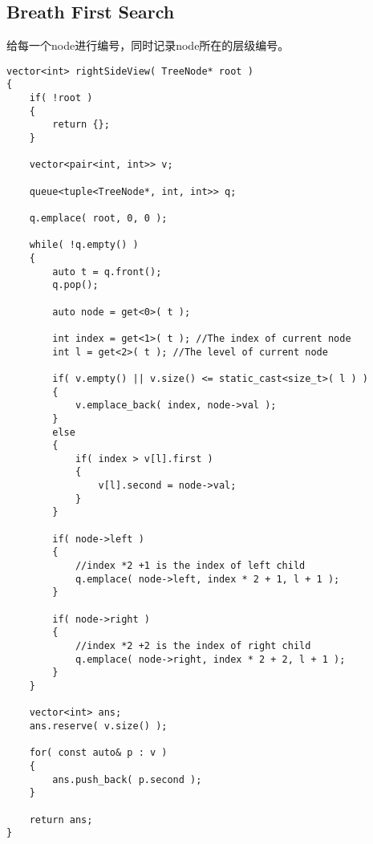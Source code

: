 \subsection{Breath First Search}
\begin{CJK*}{UTF8}{gbsn}
给每一个node进行编号，同时记录node所在的层级编号。
\end{CJK*}
\begin{lstlisting}[style=customc]
vector<int> rightSideView( TreeNode* root )
{
    if( !root )
    {
        return {};
    }

    vector<pair<int, int>> v;

    queue<tuple<TreeNode*, int, int>> q;

    q.emplace( root, 0, 0 );

    while( !q.empty() )
    {
        auto t = q.front();
        q.pop();

        auto node = get<0>( t );

        int index = get<1>( t ); //The index of current node
        int l = get<2>( t ); //The level of current node

        if( v.empty() || v.size() <= static_cast<size_t>( l ) )
        {
            v.emplace_back( index, node->val );
        }
        else
        {
            if( index > v[l].first )
            {
                v[l].second = node->val;
            }
        }

        if( node->left )
        {
            //index *2 +1 is the index of left child
            q.emplace( node->left, index * 2 + 1, l + 1 );
        }

        if( node->right )
        {
            //index *2 +2 is the index of right child
            q.emplace( node->right, index * 2 + 2, l + 1 );
        }
    }

    vector<int> ans;
    ans.reserve( v.size() );

    for( const auto& p : v )
    {
        ans.push_back( p.second );
    }

    return ans;
}
\end{lstlisting}